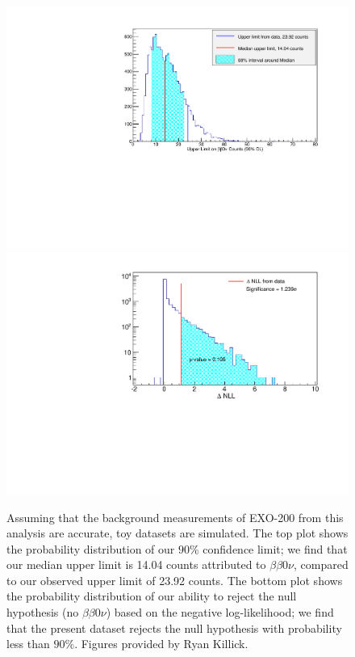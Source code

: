 \begin{figure}
\begin{center}
\includegraphics[keepaspectratio=true,width=.9\textwidth]{toy_mc_sensitivity.pdf}
\includegraphics[keepaspectratio=true,width=.9\textwidth]{toy_mc_significance.pdf}
\end{center}
\renewcommand{\baselinestretch}{1}
\small\normalsize
\begin{quote}
\caption{Assuming that the background measurements of EXO-200 from this analysis are accurate, toy datasets are simulated.  The top plot shows the probability distribution of our $90\%$ confidence limit; we find that our median upper limit is 14.04 counts attributed to $\beta\beta 0\nu$, compared to our observed upper limit of 23.92 counts.  The bottom plot shows the probability distribution of our ability to reject the null hypothesis (no $\beta\beta 0\nu$) based on the negative log-likelihood; we find that the present dataset rejects the null hypothesis with probability less than $90\%$.  Figures provided by Ryan Killick.}
\label{fig:ToyMCSensitivitySelectivity}
\end{quote}
\end{figure}
\renewcommand{\baselinestretch}{2}
\small\normalsize





